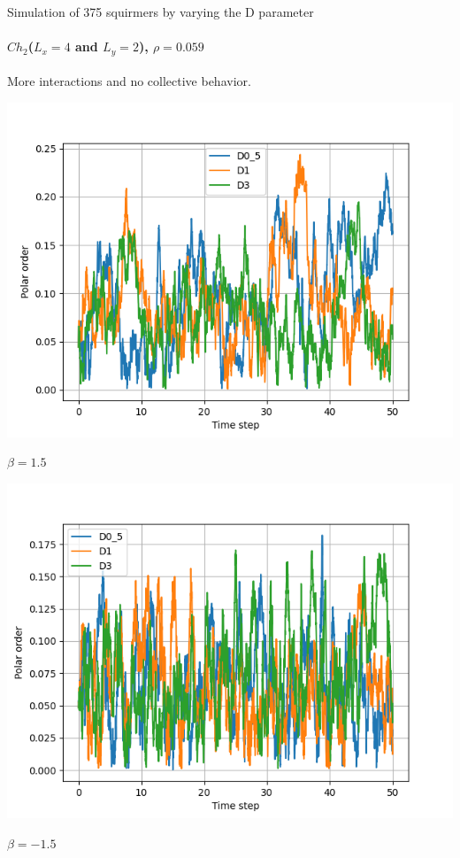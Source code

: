 \documentclass{beamer}
\begin{document}
\begin{frame}{Simulation of 375 squirmers by varying the D parameter}
    \framesubtitle{$Ch_2$($L_x = 4$ and $L_y = 2$), $\rho = 0.059$}
    \begin{center}
        More interactions and no collective behavior.
    \end{center}
    \begin{minipage}{0.49\textwidth}
        \includegraphics[width=1.15\textwidth]{../../videos/simulations/sim_D/beta1_5/dens_0_59/combined_polars.png}
        \begin{center}
            \footnotesize $\beta = 1.5$
        \end{center}
    \end{minipage}\hfill
    \begin{minipage}{0.49\textwidth}
        \includegraphics[width=1.15\textwidth]{../../videos/simulations/sim_D/betam1_5/dens_0_59/combined_polars.png}
        \begin{center}
            \footnotesize $\beta = -1.5$
        \end{center}
    \end{minipage}
\end{frame}
\end{document}
